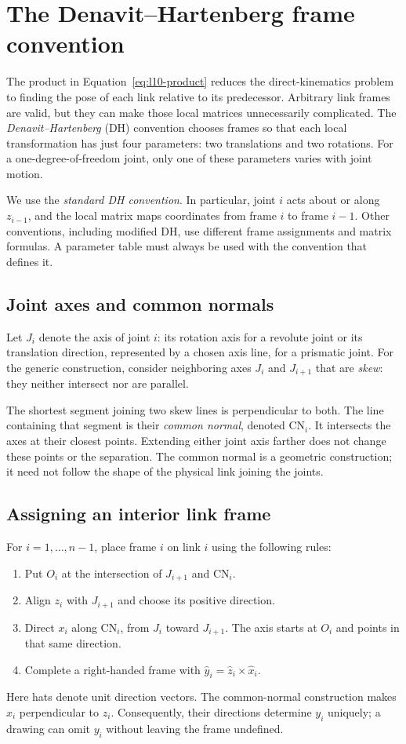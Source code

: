 \section{The Denavit--Hartenberg frame convention}
\label{sec:l10-dh}
The product in Equation~\eqref{eq:l10-product} reduces the direct-kinematics
problem to finding the pose of each link relative to its predecessor.
Arbitrary link frames are valid, but they can make those local matrices
unnecessarily complicated. The \emph{Denavit--Hartenberg} (DH) convention
chooses frames so that each local transformation has just four parameters:
two translations and two rotations. For a one-degree-of-freedom joint,
only one of these parameters varies with joint motion.

We use the \emph{standard DH convention}. In particular, joint $i$ acts
about or along $z_{i-1}$, and the local matrix maps coordinates from frame
$i$ to frame $i-1$. Other conventions, including modified DH, use different
frame assignments and matrix formulas. A parameter table must always be
used with the convention that defines it.

\subsection{Joint axes and common normals}
Let $J_i$ denote the axis of joint $i$: its rotation axis for a revolute
joint or its translation direction, represented by a chosen axis line,
for a prismatic joint. For the generic construction, consider neighboring
axes $J_i$ and $J_{i+1}$ that are \emph{skew}: they neither intersect nor
are parallel.

The shortest segment joining two skew lines is perpendicular to both.
The line containing that segment is their \emph{common normal}, denoted
$\mathrm{CN}_i$. It intersects the axes at their closest points. Extending
either joint axis farther does not change these points or the separation.
The common normal is a geometric construction; it need not follow the
shape of the physical link joining the joints.

\subsection{Assigning an interior link frame}
For $i=1,\ldots,n-1$, place frame $i$ on link $i$ using the following rules:
\begin{enumerate}
\item Put $O_i$ at the intersection of $J_{i+1}$ and $\mathrm{CN}_i$.
\item Align $z_i$ with $J_{i+1}$ and choose its positive direction.
\item Direct $x_i$ along $\mathrm{CN}_i$, from $J_i$ toward $J_{i+1}$.
      The axis starts at $O_i$ and points in that same direction.
\item Complete a right-handed frame with
      $\hat y_i=\hat z_i\times\hat x_i$.
\end{enumerate}
Here hats denote unit direction vectors. The common-normal construction
makes $x_i$ perpendicular to $z_i$. Consequently, their directions determine
$y_i$ uniquely; a drawing can omit $y_i$ without leaving the frame undefined.

